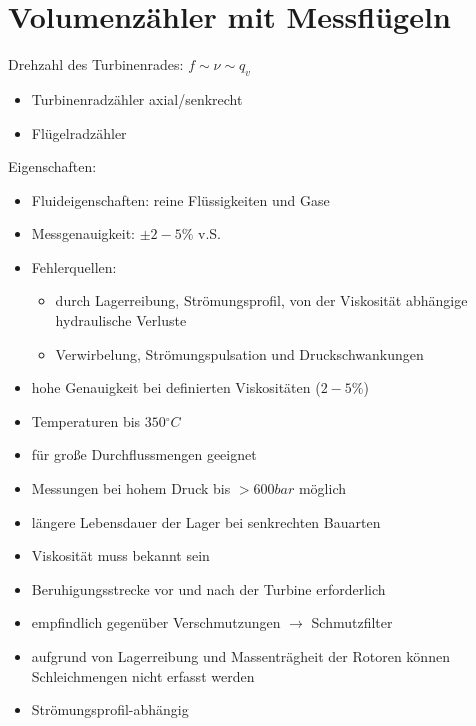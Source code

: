 \documentclass{scrreprt}
\begin{document}
\section{Volumenzähler mit Messflügeln}
Drehzahl des Turbinenrades: $f \sim \nu \sim q_v$
\begin{itemize}
\item Turbinenradzähler axial/senkrecht
\item Flügelradzähler
\end{itemize}
Eigenschaften:
\begin{itemize}
\item Fluideigenschaften: reine Flüssigkeiten und Gase
\item Messgenauigkeit: $\pm 2-5\%$ v.S.
\item Fehlerquellen:
\begin{itemize}
\item durch Lagerreibung, Strömungsprofil, von der Viskosität abhängige hydraulische Verluste
\item Verwirbelung, Strömungspulsation und Druckschwankungen
\end{itemize}
\end{itemize}
\begin{itemize}[label=$+$]
\item hohe Genauigkeit bei definierten Viskositäten ($2-5\%$)
\item Temperaturen bis $350\unit{^\circ C}$
\item für große Durchflussmengen geeignet
\item Messungen bei hohem Druck bis $>600 \unit{bar}$ möglich
\item längere Lebensdauer der Lager bei senkrechten Bauarten
\end{itemize}
\begin{itemize}[label=$-$]
\item Viskosität muss bekannt sein
\item Beruhigungsstrecke vor und nach der Turbine erforderlich
\item empfindlich gegenüber Verschmutzungen $\to$ Schmutzfilter
\item aufgrund von Lagerreibung und Massenträgheit der Rotoren können Schleichmengen nicht erfasst werden
\item Strömungsprofil-abhängig
\end{itemize}
\end{document}
